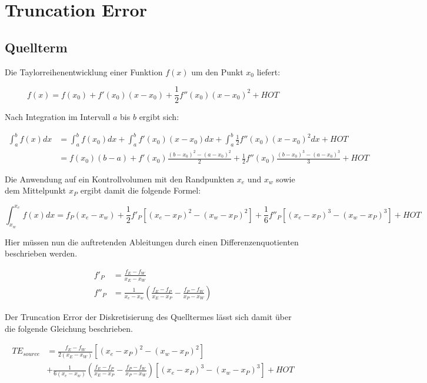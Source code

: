 \documentclass[10pt, ngerman,colorback,accentcolor=tud2d]{tudreport}
\begin{document}
\chapter{Truncation Error}
\label{cha:Truncation Error}

\section{Quellterm}
\label{sec:Quellterm}


Die Taylorreihenentwicklung einer Funktion $f(x)$ um den Punkt $x_0$
liefert:

\begin{equation*}
  f(x) = f(x_0) + f'(x_0)(x-x_0) + \frac{1}{2} f''(x_0)(x-x_0)^2 + HOT
\end{equation*}

Nach Integration im Intervall $a$ bis $b$ ergibt sich:

\begin{align*}
  \int_a^b f(x) dx &= \int_a^b f(x_0) dx + \int_a^b f'(x_0)(x-x_0) dx
+ \int_a^b \frac{1}{2} f''(x_0)(x-x_0)^2 dx + HOT\\
&= f(x_0) (b-a) + f'(x_0) \frac{(b-x_0)^2-(a-x_0)^2}{2}
+ \frac{1}{2} f''(x_0) \frac{(b-x_0)^3-(a-x_0)^3}{3} +HOT
\end{align*}

Die Anwendung auf ein Kontrollvolumen mit den Randpunkten $x_e$ und
$x_w$ sowie dem Mittelpunkt $x_P$ ergibt damit die folgende Formel:

\begin{equation*}
  \int_{x_w}^{x_e} f(x)dx = f_P(x_e-x_w)
+ \frac{1}{2} f'_P \left[{(x_e-x_P)^2-(x_w-x_P)^2}\right]
+ \frac{1}{6} f''_P \left[{{(x_e-x_P)}^3-{(x_w-x_P)}^3}\right] + HOT
\end{equation*}

Hier müssen nun die auftretenden Ableitungen durch einen Differenzenquotienten
beschrieben werden.

\begin{align*}
  f'_P &=\frac{f_E-f_W}{x_E-x_W} \\
  f''_P &= \frac{1}{x_e-x_w}\left(\frac{f_E-f_P}{x_E-x_P}-\frac{f_P-f_W}{x_P-x_W}\right)
\end{align*}

Der Truncation Error der Diskretisierung des Quelltermes lässt sich damit über die
folgende Gleichung beschrieben.

\begin{align}
  TE_{source} &=
 \frac{f_E-f_W}{2(x_E-x_W)}  \left[{(x_e-x_P)^2-(x_w-x_P)^2}\right]\\
&+\frac{1}{6(x_e-x_w)}\left(\frac{f_E-f_P}{x_E-x_P}-\frac{f_P-f_W}{x_P-x_W}\right)
  \left[{{(x_e-x_P)}^3-{(x_w-x_P)}^3}\right] + HOT
\end{align}
\end{document}
